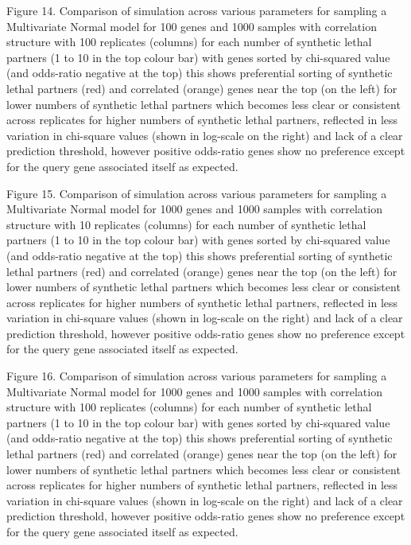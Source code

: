 Figure 14.  Comparison of simulation across various parameters for sampling a Multivariate Normal model for 100 genes and 1000 samples with correlation structure with 100 replicates (columns) for each number of synthetic lethal partners (1 to 10 in the top colour bar) with genes sorted by chi-squared value (and odds-ratio negative at the top) this shows preferential sorting of synthetic lethal partners (red) and correlated (orange) genes near the top (on the left) for lower numbers of synthetic lethal partners which becomes less clear or consistent across replicates for higher numbers of synthetic lethal partners, reflected in less variation in chi-square values (shown in log-scale on the right) and lack of a clear prediction threshold, however positive odds-ratio genes show no preference except for the query gene associated itself as expected.  
   
Figure 15.  Comparison of simulation across various parameters for sampling a Multivariate Normal model for 1000 genes and 1000 samples with correlation structure with 10 replicates (columns) for each number of synthetic lethal partners (1 to 10 in the top colour bar) with genes sorted by chi-squared value (and odds-ratio negative at the top) this shows preferential sorting of synthetic lethal partners (red) and correlated (orange) genes near the top (on the left) for lower numbers of synthetic lethal partners which becomes less clear or consistent across replicates for higher numbers of synthetic lethal partners, reflected in less variation in chi-square values (shown in log-scale on the right) and lack of a clear prediction threshold, however positive odds-ratio genes show no preference except for the query gene associated itself as expected.
    
Figure 16.  Comparison of simulation across various parameters for sampling a Multivariate Normal model for 1000 genes and 1000 samples with correlation structure with 100 replicates (columns) for each number of synthetic lethal partners (1 to 10 in the top colour bar) with genes sorted by chi-squared value (and odds-ratio negative at the top) this shows preferential sorting of synthetic lethal partners (red) and correlated (orange) genes near the top (on the left) for lower numbers of synthetic lethal partners which becomes less clear or consistent across replicates for higher numbers of synthetic lethal partners, reflected in less variation in chi-square values (shown in log-scale on the right) and lack of a clear prediction threshold, however positive odds-ratio genes show no preference except for the query gene associated itself as expected.

